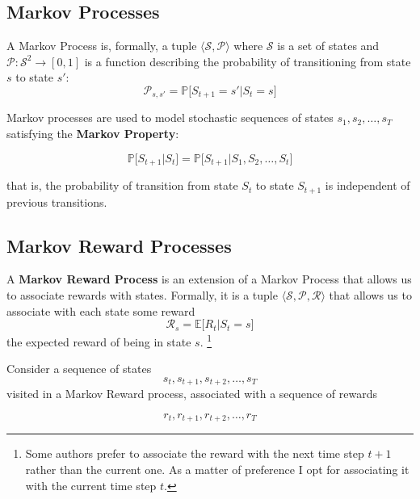 \documentclass[journal, onecolumn, 12pt, draftclsnofoot]{IEEEtran}
\numberwithin{equation}{section}
\newcommand{\kword}[1]{\textbf{#1}}
\newcommand{\mc}[1]{\mathcal{#1}}
\begin{document}
		\subsection{Markov Processes}
		\par A Markov Process is, formally, a tuple $\langle \mc{S}, \mc{P} \rangle$ where $\mc{S}$ is a set of states and $\mc{P} : \mc{S}^2 \to [0, 1]$ is a function describing the probability of transitioning from state $s$ to state $s'$:
		\begin{equation}
			\label{eqn:state_transition_probability}
			\mc{P}_{s,s'} = \mathbb{P} \big[ S_{t+1} = s' \vert S_t = s \big]
		\end{equation}

		 \par Markov processes are used to model stochastic sequences of states $s_1, s_2, \dots, s_T$ satisfying the \kword{Markov Property}:

	\begin{equation}
		\label{eqn:markov_property}
		\mathbb{P}\big[ S_{t+1} \vert S_t \big] = \mathbb{P}\big[ {S_{t+1} \vert S_1, S_2, \dots, S_t} \big]
	\end{equation}

	that is, the probability of transition from state $S_t$ to state $S_{t+1}$ is independent of previous transitions.
	\subsection{Markov Reward Processes}
	\par A \kword{Markov Reward Process} is an extension of a Markov Process that allows us to associate rewards with states. Formally, it is a tuple $\langle \mc{S}, \mc{P}, \mc{R} \rangle$ that allows us to associate with each state some reward
	\begin{equation}
		\label{eqn:reward_process}
		\mc{R}_s = \mathbb{E}\big[R_t \vert S_t = s \big]
	\end{equation}
	the expected reward of being in state $s$. \footnote{Some authors prefer to associate the reward with the next time step $t+1$ rather than the current one. As a matter of preference I opt for associating it with the current time step $t$.}
	\par Consider a sequence of states
	$$s_t, s_{t+1}, s_{t+2}, \dots, s_{T}$$
	visited in a Markov Reward process, associated with a sequence of rewards

	\begin{equation}
		\label{eqn:undiscounted_rewards}
		r_t, r_{t+1}, r_{t+2}, \dots, r_{T}
	\end{equation}
\end{document}
